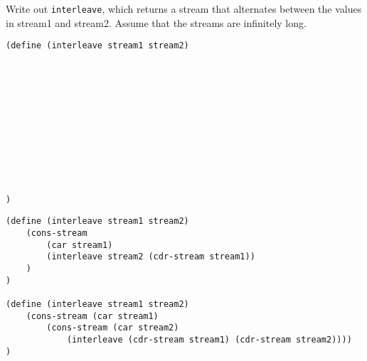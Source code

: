 \question Write out \texttt{interleave}, which returns a stream that alternates
between the values in stream1 and stream2. Assume that the streams are
infinitely long.

\begin{lstlisting}
(define (interleave stream1 stream2)












)
\end{lstlisting}

\begin{solution}
\begin{lstlisting}
(define (interleave stream1 stream2)
    (cons-stream
        (car stream1)
        (interleave stream2 (cdr-stream stream1))
    )
)

(define (interleave stream1 stream2)
    (cons-stream (car stream1)
        (cons-stream (car stream2)
            (interleave (cdr-stream stream1) (cdr-stream stream2))))
)
\end{lstlisting}
\end{solution}

